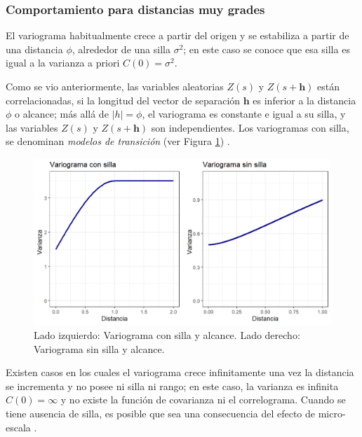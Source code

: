 \documentclass[
]{book}
\begin{document}
\hypertarget{comportamiento-para-distancias-muy-grades}{%
\subsubsection*{Comportamiento para distancias muy grades}\label{comportamiento-para-distancias-muy-grades}}

El variograma habitualmente crece a partir del origen y se estabiliza a partir de una distancia \(\phi\), alrededor de una silla \(\sigma^2\); en este caso se conoce que esa silla es igual a la varianza a priori \(C(0)=\sigma^2\).

Como se vio anteriormente, las variables aleatorias \(Z(s)\) y \(Z(s+\textbf{h})\) están correlacionadas, si la longitud del vector de separación \(\textbf{h}\) es inferior a la distancia \(\phi\) o alcance; más allá de \(|h|=\phi\), el variograma es constante e igual a su silla, y las variables \(Z(s)\) y \(Z(s+\textbf{h})\) son independientes. Los variogramas con silla, se denominan \textit{modelos de transición} (ver Figura \ref{fig:varsill}) \citep{emery}.

\begin{figure}
\includegraphics[width=17.78in]{figuras/otros/vari_sill} \caption{Lado izquierdo: Variograma con silla y alcance. Lado derecho: Variograma sin silla y  alcance.}\label{fig:varsill}
\end{figure}

Existen casos en los cuales el variograma crece infinitamente una vez la distancia se incrementa y no posee ni silla ni rango; en este caso, la varianza es infinita \(C(0)=\infty\) y no existe la función de covarianza ni el correlograma. Cuando se tiene ausencia de silla, es posible que sea una consecuencia del efecto de micro-escala \citep{emery}.
\end{document}
